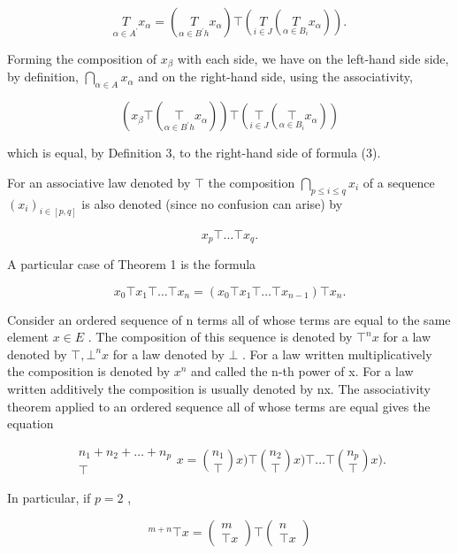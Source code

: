 \[
\underset {\alpha \in A ^ {\prime}} {T} x _ {\alpha} = \left(\underset {\alpha \in B ^ {\prime} h} {T} x _ {\alpha}\right) \top \left(\underset {i \in J} {T} \left(\underset {\alpha \in B _ {i}} {T} x _ {\alpha}\right)\right).
\]

Forming the composition of \(x_{\beta}\) with each side, we have on the left-hand side side, by definition, \(\bigcap_{\alpha \in A} x_{\alpha}\) and on the right-hand side, using the associativity,

\[
\left(x _ {\beta} \top \left(\underset {\alpha \in B ^ {\prime} h} {\top} x _ {\alpha}\right)\right) \top \left(\underset {i \in J} {\top} \left(\underset {\alpha \in B _ {i}} {\top} x _ {\alpha}\right)\right)
\]

which is equal, by Definition 3, to the right-hand side of formula (3).

For an associative law denoted by \(\top\) the composition \(\bigcap_{p\leqslant i\leqslant q}x_i\) of a sequence \((x_i)_{i\in [p,q]}\) is also denoted (since no confusion can arise) by

\[
x _ {p} \top \dots \top x _ {q}.
\]

A particular case of Theorem 1 is the formula

\[
x _ {0} \top x _ {1} \top \dots \top x _ {n} = (x _ {0} \top x _ {1} \top \dots \top x _ {n - 1}) \top x _ {n}.
\]

Consider an ordered sequence of n terms all of whose terms are equal to the same element \(x \in E\) . The composition of this sequence is denoted by \(\top^{n} x\) for a law denoted by \(\top, \bot^{n} x\) for a law denoted by \(\bot\) . For a law written multiplicatively the composition is denoted by \(x^{n}\) and called the n-th power of x. For a law written additively the composition is usually denoted by nx. The associativity theorem applied to an ordered sequence all of whose terms are equal gives the equation

\[
\begin{array}{c} n _ {1} + n _ {2} + \dots + n _ {p} \\ \top \end{array} x = \binom {n _ {1}} {\top} x) \top \binom {n _ {2}} {\top} x) \top \dots \top \binom {n _ {p}} {\top} x).
\]

In particular, if \(p = 2\) ,

\[
{ } ^ { m + n } \top x = \left( \begin{array} { c } m \\ \top x \end{array} \right) \top \left( \begin{array} { c } n \\ \top x \end{array} \right)\tag{4}
\]

